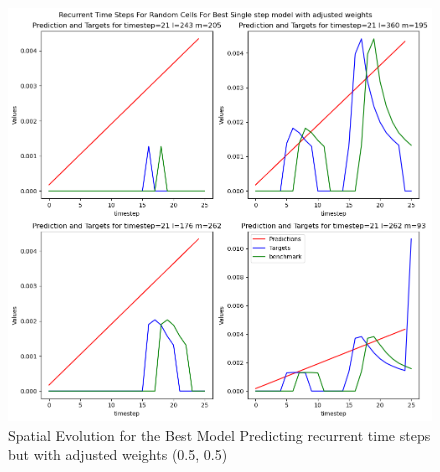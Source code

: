 \begin{figure}[tbph]
	\centering
	\includegraphics[width=0.8\linewidth, height=0.3\textheight]{Figures/Results/Final_Results/Best_SS_adjusted_weights(5,5)}
	\caption[Spatial Single Time step Predictions]{Spatial Evolution for the Best Model Predicting recurrent time steps but with adjusted weights (0.5, 0.5)}
	\label{fig:adjusted-recurrent-rc}
\end{figure}



